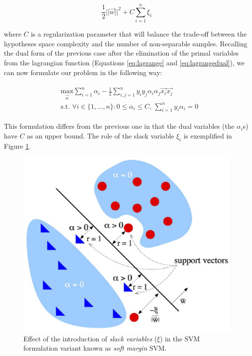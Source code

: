 \begin{equation}
    \frac{1}{2}||\vec{w}||^2 + C \sum_{i=1}^n \xi_i
\end{equation}

where $C$ is a regularization parameter that will balance the trade-off between
the hypotheses space complexity and the number of non-separable samples.
Recalling the dual form of the previous case after the elimination of the primal
variables from the lagrangian function (Equations \ref{eq:lagrange} and \ref{eq:lagrangedual}),
we can now formulate our problem in the following way:

\begin{gather}
    \begin{aligned}
    & \underset{\vec{\alpha}}{\mathrm{max}} \sum_{i=1}^n \alpha_i - \frac{1}{2} \sum_{i,j=1}^n y_iy_j\alpha_i\alpha_j\vec{x_i}\vec{x_j}\\
    & \text{s.t. } \forall i \in \{1,\dots, n\} : 0 \leq \alpha_i \leq C,\, \sum_{i=1}^n y_i\alpha_i = 0 
    \end{aligned}
\end{gather}

This formulation differs from the previous one in that the dual variables (the $\alpha_i$s)
have $C$ as an upper bound.
The role of the slack variable $\xi_i$ is exemplified in Figure \ref{fig:slacks}.

\begin{figure}[ht]
    \centering
    \includegraphics[scale=0.4]{Figures/slacks2}
    \caption{Effect of the introduction of \emph{slack variables} ($\xi$) in the SVM
    formulation variant known as \emph{soft margin} SVM.}
    \label{fig:slacks}
\end{figure}

